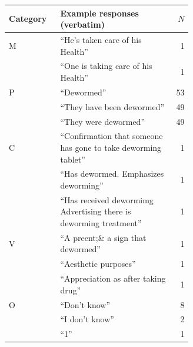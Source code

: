 \begin{tabular}{lp{0.62\linewidth}r}
\toprule
Category & Example responses (verbatim) & $N$ \\
\midrule
M & ``He's taken care of his Health'' & 1 \\
 & ``One is taking care of his Health'' & 1 \\
\addlinespace
P & ``Dewormed'' & 53 \\
 & ``They have been dewormed'' & 49 \\
 & ``They were dewormed'' & 49 \\
\addlinespace
C & ``Confirmation that someone has gone to take deworming tablet'' & 1 \\
 & ``Has dewormed. Emphasizes deworming'' & 1 \\
 & ``Has received dewormimg Advertising there is deworming treatment'' & 1 \\
\addlinespace
V & ``A preent;\& a sign that dewormed'' & 1 \\
 & ``Aesthetic purposes'' & 1 \\
 & ``Appreciation as after taking drug'' & 1 \\
\addlinespace
O & ``Don't know'' & 8 \\
 & ``I don't know'' & 2 \\
 & ``1'' & 1 \\
\bottomrule
\end{tabular}
